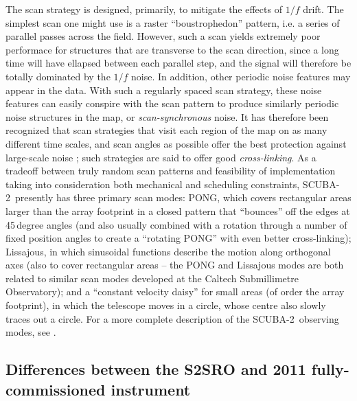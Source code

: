 \documentclass[useAMS,usenatbib,nofootinbib]{mn2e}
\newcommand{\scuba}{SCUBA-2}
\begin{document}
The scan strategy is designed, primarily, to mitigate the effects of
$1/f$ drift. The simplest scan one might use is a raster
``boustrophedon'' pattern, i.e. a series of parallel passes across the
field. However, such a scan yields extremely poor performace for
structures that are transverse to the scan direction, since a long
time will have ellapsed between each parallel step, and the signal
will therefore be totally dominated by the $1/f$ noise. In addition,
other periodic noise features may appear in the data. With such a
regularly spaced scan strategy, these noise features can easily
conspire with the scan pattern to produce similarly periodic noise
structures in the map, or \emph{scan-synchronous} noise. It has
therefore been recognized that scan strategies that visit each region
of the map on as many different time scales, and scan angles as
possible offer the best protection against large-scale noise
\citep[see discussion in][and references therein]{kovacs2008b}; such
strategies are said to offer good \emph{cross-linking}. As a tradeoff
between truly random scan patterns and feasibility of implementation
taking into consideration both mechanical and scheduling constraints,
\scuba\ presently has three primary scan modes: PONG, which covers
rectangular areas larger than the array footprint in a closed pattern
that ``bounces'' off the edges at 45\,degree angles (and also usually
combined with a rotation through a number of fixed position angles to
create a ``rotating PONG'' with even better cross-linking); Lissajous,
in which sinusoidal functions describe the motion along orthogonal
axes (also to cover rectangular areas -- the PONG and Lissajous modes
are both related to similar scan modes developed at the Caltech
Submillimetre Observatory); and a ``constant velocity daisy'' for
small areas (of order the array footprint), in which the telescope
moves in a circle, whose centre also slowly traces out a circle. For a
more complete description of the \scuba\ observing modes, see
\citet{holland2012}.

\subsection{Differences between the S2SRO and 2011 fully-commissioned instrument}
\label{sec:s2sro}
\end{document}
